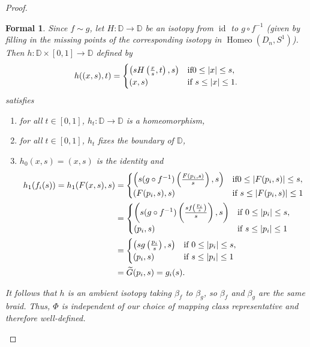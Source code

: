 \documentclass{amsart}
\DeclareMathOperator{\id}{id}
\DeclareMathOperator{\Homeo}{Homeo}
\newtheorem*{formal}{Formal}
\begin{document}
\begin{proof}
\begin{formal}
		Since \(f\sim g\), let \(H: \mathbb{D}\to\mathbb{D}\) be an isotopy from
		\(\id\) to \(g\circ f^{-1}\) (given by filling in the missing points
		of the corresponding isotopy in \(\Homeo(D_n, S^1)\)). Then \(h:
		\mathbb{D}\times[0, 1]\to\mathbb{D}\) defined by 
		\[
			h((x, s), t) = 
			\begin{cases}
				\left(sH\left(\frac{x}{s}, t\right), s\right) &\text{if}
				0\le\abs{x}\le s,\\
				(x, s) & \text{if }s\le\abs{x}\le 1.
			\end{cases}
		\] 
		satisfies 
		\begin{enumerate}[label=(\roman*)]
			\item for all \(t\in[0, 1]\), \(h_t: \mathbb{D}\to\mathbb{D}\) is a
			homeomorphism,
			\item for all \(t\in[0, 1]\), \(h_t\) fixes the boundary of
			\(\mathbb{D}\),
			\item \(h_0(x, s) = (x, s)\) is the identity and 
			\begin{align*}
				h_1(f_i(s)) = h_1(F(x, s), s) &= 
				\begin{cases}
					\left(s(g\circ f^{-1})\left(\frac{F(p_i, s)}{s}\right),
					s\right)&\text{if}0\le\abs{F(p_i, s)}\le s,\\
					(F(p_i, s), s) &\text{if }s\le\abs{F(p_i, s)}\le 1
				\end{cases} \\
				&= 
				\begin{cases}
					\left(s(g\circ f^{-1})\left(\frac{sf\left(\frac{p_i}{s}\right)}{s}
					\right), s\right) &\text{if }0\le \abs{p_i}\le s,\\
					(p_i, s)&\text{if } s\le \abs{p_i}\le 1
				\end{cases}\\
				&= 
				\begin{cases}
					\left(sg\left(\frac{p_i}{s}\right), s\right) &\text{if }0\le
					\abs{p_i}\le s,\\
					(p_i, s) &\text{if }s\le\abs{p_i}\le 1
				\end{cases}\\
				&=\widetilde{G}(p_i, s) = g_i(s).
			\end{align*}
		\end{enumerate}
		It follows that \(h\) is an ambient isotopy taking \(\beta_f\) to
		\(\beta_g\), so \(\beta_f\) and \(\beta_g\) are the same braid. Thus,
		\(\Phi\) is independent of our choice of mapping class representative and
		therefore well-defined.
	\end{formal}
\end{proof}
\end{document}
